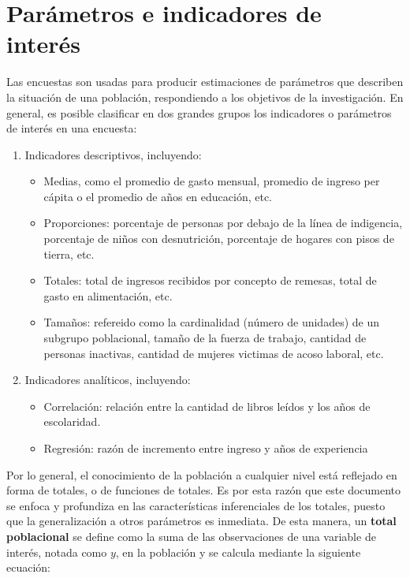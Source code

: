 \documentclass[
  12pt,
]{book}
\providecommand{\tightlist}{%
  \setlength{\itemsep}{0pt}\setlength{\parskip}{0pt}}
\begin{document}
\hypertarget{paruxe1metros-e-indicadores-de-interuxe9s}{%
\section{Parámetros e indicadores de interés}\label{paruxe1metros-e-indicadores-de-interuxe9s}}

Las encuestas son usadas para producir estimaciones de parámetros que describen la situación de una población, respondiendo a los objetivos de la investigación. En general, es posible clasificar en dos grandes grupos los indicadores o parámetros de interés en una encuesta:

\begin{enumerate}
\def\labelenumi{\arabic{enumi}.}
\tightlist
\item
  Indicadores descriptivos, incluyendo:

  \begin{itemize}
  \tightlist
  \item
    Medias, como el promedio de gasto mensual, promedio de ingreso per cápita o el promedio de años en educación, etc.
  \item
    Proporciones: porcentaje de personas por debajo de la línea de indigencia, porcentaje de niños con desnutrición, porcentaje de hogares con pisos de tierra, etc.
  \item
    Totales: total de ingresos recibidos por concepto de remesas, total de gasto en alimentación, etc.
  \item
    Tamaños: refereido como la cardinalidad (número de unidades) de un subgrupo poblacional, tamaño de la fuerza de trabajo, cantidad de personas inactivas, cantidad de mujeres victimas de acoso laboral, etc.
  \end{itemize}
\item
  Indicadores analíticos, incluyendo:

  \begin{itemize}
  \tightlist
  \item
    Correlación: relación entre la cantidad de libros leídos y los años de escolaridad.
  \item
    Regresión: razón de incremento entre ingreso y años de experiencia
  \end{itemize}
\end{enumerate}

Por lo general, el conocimiento de la población a cualquier nivel está reflejado en forma de totales, o de funciones de totales. Es por esta razón que este documento se enfoca y profundiza en las características inferenciales de los totales, puesto que la generalización a otros parámetros es inmediata. De esta manera, un \textbf{total poblacional} se define como la suma de las observaciones de una variable de interés, notada como \(y\), en la población y se calcula mediante la siguiente ecuación:
\end{document}
